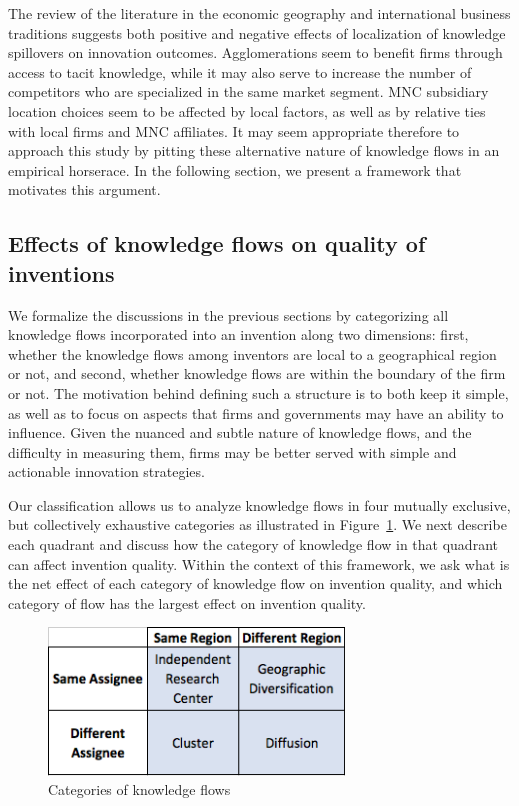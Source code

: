 \documentclass[12pt,letterpaper]{article}
\begin{document}
The review of the literature in the economic geography and international business traditions suggests both positive and negative effects of localization of knowledge spillovers on innovation outcomes.  Agglomerations seem to benefit firms through access to tacit knowledge, while it may also serve to increase the number of competitors who are specialized in the same market segment. MNC subsidiary location choices seem to be affected by local factors, as well as by relative ties with local firms and MNC affiliates. It may seem appropriate therefore to approach this study by pitting these alternative nature of knowledge flows in an empirical horserace. In the following section, we present a framework that motivates this argument.  

\subsection*{Effects of knowledge flows on quality of inventions}

We formalize the discussions in the previous sections by categorizing all knowledge flows incorporated into an invention along two dimensions:  first, whether the knowledge flows among inventors are local to a geographical region or not, and second, whether knowledge flows are within the boundary of the firm or not. The motivation behind defining such a structure is to both keep it simple, as well as to focus on aspects that firms and governments may have an ability to influence. Given the nuanced and subtle nature of knowledge flows, and the difficulty in measuring them, firms may be better served with simple and actionable innovation strategies. \par

Our classification allows us to analyze knowledge flows in four mutually exclusive, but collectively exhaustive categories as illustrated in Figure~\ref{fig:2x2}. We next describe each quadrant and discuss how the category of knowledge flow in that quadrant can affect invention quality. Within the context of this framework, we ask what is the net effect of each category of knowledge flow on invention quality, and which category of flow has the largest effect on invention quality. \par


\begin{figure}[h!]
\begin{centering}
  \caption{Categories of knowledge flows}
  \label{fig:2x2}
  \includegraphics[width=0.7\textwidth]{2x2}
\end{centering}
\end{figure}
\end{document}
